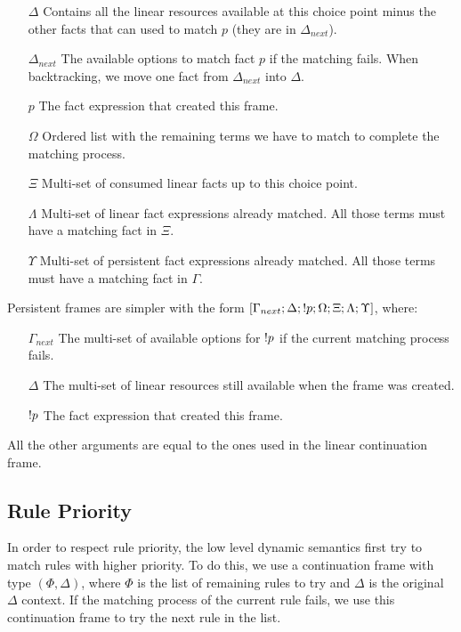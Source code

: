 \begin{enumerate}
   \item[$\Delta$] Contains all the linear resources available at this choice point minus the other facts that can used to match $p$ (they are in $\Delta_{next}$).
   \item[$\Delta_{next}$] The available options to match fact $p$ if the matching fails. When backtracking, we move one fact from $\Delta_{next}$ into $\Delta$.
   \item[$p$] The fact expression that created this frame.
   \item[$\Omega$] Ordered list with the remaining terms we have to match to complete the matching process.
   \item[$\Xi$] Multi-set of consumed linear facts up to this choice point.
   \item[$\Lambda$] Multi-set of linear fact expressions already matched. All those terms must have a matching fact in $\Xi$.
   \item[$\Upsilon$] Multi-set of persistent fact expressions already matched. All those terms must have a matching fact in $\Gamma$.
\end{enumerate}

Persistent frames are simpler with the form $[\Gamma_{next}; \Delta; {!} p; \Omega; \Xi; \Lambda; \Upsilon]$, where:

\begin{enumerate}
   \item[$\Gamma_{next}$] The multi-set of available options for ${!} p$ if the current matching process fails.
   \item[$\Delta$] The multi-set of linear resources still available when the frame was created.
   \item[${!} p$] The fact expression that created this frame.
\end{enumerate}

All the other arguments are equal to the ones used in the linear continuation frame.

\subsection{Rule Priority}

In order to respect rule priority, the low level dynamic semantics first try to match rules with
higher priority. To do this, we use a continuation frame with type $(\Phi, \Delta)$, where $\Phi$
is the list of remaining rules to try and $\Delta$ is the original $\Delta$ context. If the matching
process of the current rule fails, we use this continuation frame to try the next rule in the list.

